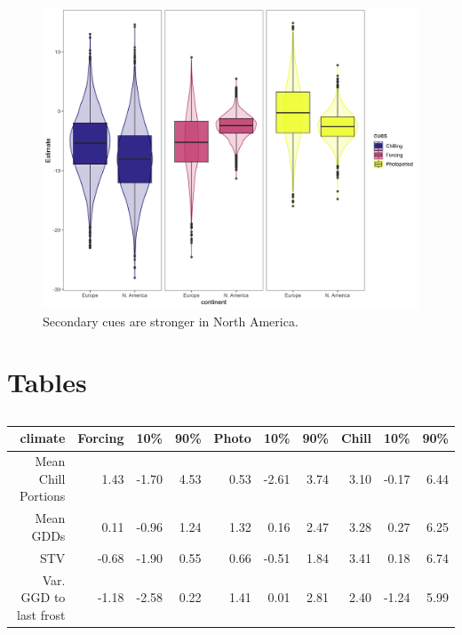 \documentclass[12pt]{article}\usepackage[]{graphicx}\usepackage[]{color}
\begin{document}
\begin{figure}[h!]
    \centering
 \includegraphics[width=\textwidth]{..//..//analyses/ranges/figures/ontinental_cues.jpeg} 
    \caption{Secondary cues are stronger in North America. }
    \label{fig:cuediff}
\end{figure}

\pagebreak
\iffalse 

\section*{Tables}
\begin{table}
\centering
\begin{tabular}{|r|rrr|rrr|rrr|}
  \hline
  climate & Forcing & 10\% & 90\% & Photo & 10\% & 90\% & Chill & 10\% & 90\% \\ 
  \hline
 Mean Chill Portions & 1.43 & -1.70 & 4.53 & 0.53 & -2.61 & 3.74 & 3.10 & -0.17 & 6.44 \\ 
  Mean GDDs & 0.11 & -0.96 & 1.24 & 1.32 & 0.16 & 2.47 & 3.28 & 0.27 & 6.25 \\ 
   STV & -0.68 & -1.90 & 0.55 & 0.66 & -0.51 & 1.84 & 3.41 & 0.18 & 6.74 \\ 
   Var. GGD to last frost & -1.18 & -2.58 & 0.22 & 1.41 & 0.01 & 2.81 & 2.40 & -1.24 & 5.99 \\ 
   \hline
\end{tabular}
\label{tab:outfull}
\caption{}
\end{table}
\end{document}
